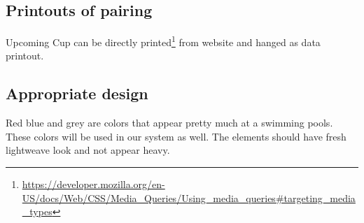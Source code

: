 \subsection*{Printouts of pairing}
Upcoming Cup can be directly printed\footnote{\url{https://developer.mozilla.org/en-US/docs/Web/CSS/Media_Queries/Using_media_queries\#targeting_media_types}} from website and hanged as data printout. 
\subsection*{Appropriate design}
\par
Red blue and grey are colors that appear pretty much at a swimming pools. These colors will be used in our system as well. The elements should have fresh lightweave look and not appear heavy.
